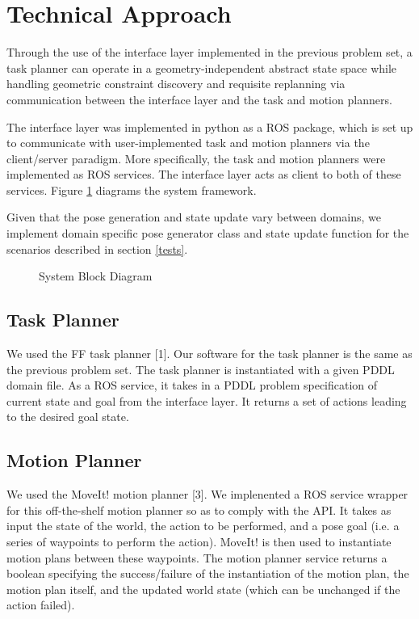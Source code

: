 \documentclass[12pt]{article}
\begin{document}
\section{Technical Approach}
Through the use of the interface layer implemented in the previous problem set, a task planner can operate in a geometry-independent abstract state space while handling geometric constraint discovery and requisite replanning via communication between the interface layer and the task and motion planners. 

The interface layer was implemented in python as a ROS package, which is set up to communicate with user-implemented task and motion planners via the client/server paradigm. More specifically, the task and motion planners were implemented as ROS services. The interface layer acts as client to both of these services. Figure \ref{fig:blockDiagram} diagrams the system framework.

Given that the pose generation and state update vary between domains, we implement domain specific pose generator class and state update function for the scenarios described in section \ref{tests}.


\begin{figure}[h]
\centering
\def\svgwidth{0.5\textwidth}

\caption{System Block Diagram\label{fig:blockDiagram}}
\end{figure}

\subsection{Task Planner}
We used the FF task planner [1]. 
Our software for the task planner is the same as the previous problem set. 
The task planner is instantiated with a given PDDL domain file.  
As a ROS service, it takes in a PDDL problem specification of current state and goal from the interface layer. 
It returns a set of actions leading to the desired goal state. 

\subsection{Motion Planner}
We used the MoveIt! motion planner [3]. We implenented a ROS service wrapper for this off-the-shelf motion planner so as to comply with the API.
It takes as input the state of the world, the action to be performed, and a pose goal (i.e. a series of waypoints to perform the action).
MoveIt! is then used to instantiate motion plans between these waypoints. The motion planner service returns a boolean specifying the success/failure of the instantiation of the motion plan, the motion plan itself, and the updated world state (which can be unchanged if the action failed).
\end{document}

